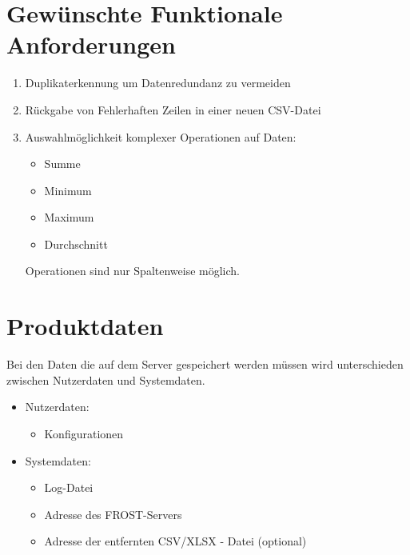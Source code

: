 \documentclass[12 pt]{article}
\begin{document}
	\section{Gewünschte Funktionale Anforderungen}
	\begin{enumerate}
		\item Duplikaterkennung um Datenredundanz zu vermeiden
		
		\item Rückgabe von Fehlerhaften Zeilen in einer neuen CSV-Datei
		
		\item Auswahlmöglichkeit komplexer Operationen auf Daten:
		\begin{itemize}
			\item Summe
			\item Minimum
			\item Maximum
			\item Durchschnitt
		\end{itemize}
		Operationen sind nur Spaltenweise  möglich. 
	\end{enumerate}

	\section{Produktdaten}
	
	Bei den Daten die auf dem Server gespeichert werden müssen wird unterschieden zwischen Nutzerdaten und Systemdaten.
	
\begin{itemize}
	\item Nutzerdaten:
	\begin{itemize}
		\item Konfigurationen
	\end{itemize}
	\item Systemdaten:
	\begin{itemize}
		\item Log-Datei
		\item Adresse des FROST-Servers
		\item Adresse der entfernten CSV/XLSX - Datei (optional) 
	\end{itemize}
\end{itemize}
	
\end{document}
